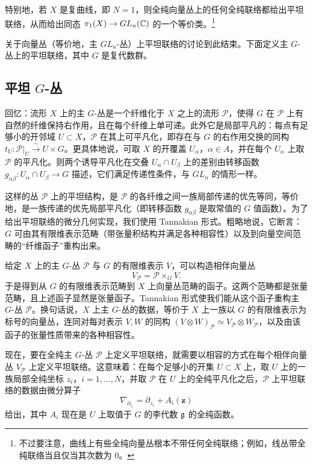 特别地，若 $X$ 是复曲线，即 $N=1$，则全纯向量丛上的任何全纯联络都给出平坦联络，从而给出同态 $\pi_1(X)\to GL_n(\mathbb{C})$ 的一个等价类。\footnote{不过要注意，曲线上有些全纯向量丛根本不带任何全纯联络；例如，线丛带全纯联络当且仅当其次数为 $0$。}

关于向量丛（等价地，主 $GL_n$-丛）上平坦联络的讨论到此结束。下面定义主 $G$-丛上的平坦联络，其中 $G$ 是复代数群。

\subsection{平坦 \texorpdfstring{$G$}{G}-丛}

回忆：流形 $X$ 上的主 $G$-丛是一个纤维化于 $X$ 之上的流形 $\mathcal{P}$，使得 $G$ 在 $\mathcal{P}$ 上有自然的纤维保持右作用，且在每个纤维上单可递。此外它是局部平凡的：每点有足够小的开邻域 $U\subset X$，$\mathcal{P}$ 在其上可平凡化，即存在与 $G$ 的右作用交换的同构 $t_U:\mathcal{P}|_U\xrightarrow{\ \sim\ }U\times G$。更具体地说，可取 $X$ 的开覆盖 $U_\alpha$，$\alpha\in A$，并在每个 $U_\alpha$ 上取 $\mathcal{P}$ 的平凡化。则两个诱导平凡化在交叠 $U_\alpha\cap U_\beta$ 上的差别由转移函数 $g_{\alpha\beta}:U_\alpha\cap U_\beta\to G$ 描述，它们满足传递性条件，与 $GL_n$ 的情形一样。

这样的丛 $\mathcal{P}$ 上的平坦结构，是 $\mathcal{P}$ 的各纤维之间一族局部传递的优先等同，等价地，是一族传递的优先局部平凡化（即转移函数 $g_{\alpha\beta}$ 是取常值的 $G$ 值函数）。为了给出平坦联络的微分几何实现，我们使用 Tannakian 形式。粗略地说，它断言：$G$ 可由其有限维表示范畴（带张量积结构并满足各种相容性）以及到向量空间范畴的“纤维函子”重构出来。

给定 $X$ 上的主 $G$-丛 $\mathcal{P}$ 与 $G$ 的有限维表示 $V$，可以构造相伴向量丛
\[
    V_{\mathcal{P}}=\mathcal{P}\times_G V.
\]
于是得到从 $G$ 的有限维表示范畴到 $X$ 上向量丛范畴的函子。这两个范畴都是张量范畴，且上述函子显然是张量函子。Tannakian 形式使我们能从这个函子重构主 $G$-丛 $\mathcal{P}$。换句话说，$X$ 上主 $G$-丛的数据，等价于 $X$ 上一族以 $G$ 的有限维表示为标号的向量丛，连同对每对表示 $V,W$ 的同构 $(V\otimes W)_{\mathcal{P}}\simeq V_{\mathcal{P}}\otimes W_{\mathcal{P}}$，以及由该函子的张量性质带来的各种相容性。

现在，要在全纯主 $G$-丛 $\mathcal{P}$ 上定义平坦联络，就需要以相容的方式在每个相伴向量丛 $V_{\mathcal{P}}$ 上定义平坦联络。这意味着：在每个足够小的开集 $U\subset X$ 上，取 $U$ 上的一族局部全纯坐标 $z_i$，$i=1,\dots,N$，并取 $\mathcal{P}$ 在 $U$ 上的全纯平凡化之后，$\mathcal{P}$ 上平坦联络的数据由微分算子
\[
    \nabla_{\partial_{z_i}}=\partial_{z_i}+A_i(\mathbf{z})
\]
给出，其中 $A_i$ 现在是 $U$ 上取值于 $G$ 的李代数 $\mathfrak{g}$ 的全纯函数。

